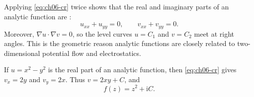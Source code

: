 Applying \eqref{eq:ch06-cr} twice shows that the real and imaginary parts of an analytic function are :
\begin{equation}
u_{xx}+u_{yy}=0,\qquad v_{xx}+v_{yy}=0.
\end{equation}
Moreover, $\nabla u\cdot\nabla v=0$, so the level curves $u=C_1$ and $v=C_2$ meet at right angles. This is the geometric reason analytic functions are closely related to two-dimensional potential flow and electrostatics.

\begin{example}
If $u=x^2-y^2$ is the real part of an analytic function, then \eqref{eq:ch06-cr} gives $v_x=2y$ and $v_y=2x$. Thus $v=2xy+C$, and
\begin{equation}
f(z)=z^2+\mathrm{i}C.
\end{equation}
\end{example}